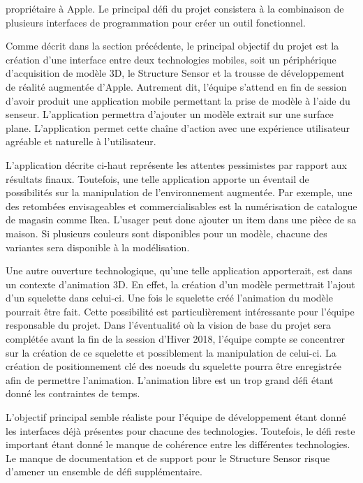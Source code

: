 \documentclass[letterpaper,twoside,12pt,french]{report}
\begin{document}
propriétaire à Apple. Le principal défi du projet consistera à la combinaison de plusieurs
interfaces de programmation pour créer un outil fonctionnel.
\par
Comme décrit dans la section précédente, le principal objectif du projet est la création d'une
interface entre deux technologies mobiles, soit un périphérique d'acquisition de modèle 3D, le
Structure Sensor et la trousse de développement de réalité augmentée d'Apple. Autrement dit,
l'équipe s'attend en fin de session d'avoir produit une application mobile permettant la prise
de modèle à l'aide du senseur. L'application permettra d'ajouter un modèle extrait sur une surface
plane. L'application permet cette chaîne d'action avec une expérience utilisateur agréable et
naturelle à l'utilisateur.
\par
L'application décrite ci-haut représente les attentes pessimistes par rapport aux résultats finaux.
Toutefois, une telle application apporte un éventail de possibilités sur la manipulation de
l'environnement augmentée. Par exemple, une des retombées envisageables et
commercialisables est la numérisation de catalogue de magasin comme Ikea. L'usager peut
donc ajouter un item dans une pièce de sa maison. Si plusieurs couleurs sont disponibles pour
un modèle, chacune des variantes sera disponible à la modélisation.
\par
Une autre ouverture technologique, qu'une telle application apporterait, est dans un contexte
d'animation 3D. En effet, la création d'un modèle permettrait l'ajout d'un squelette dans celui-ci.
Une fois le squelette créé l'animation du modèle pourrait être fait. Cette possibilité est
particulièrement intéressante pour l'équipe responsable du projet. Dans l'éventualité où la vision
de base du projet sera complétée avant la fin de la session d'Hiver 2018, l'équipe compte se
concentrer sur la création de ce squelette et possiblement la manipulation de celui-ci. La création
de positionnement clé des noeuds du squelette pourra être enregistrée afin de permettre l'animation.
L'animation libre est un trop grand défi étant donné les contraintes de temps.
\par
L'objectif principal semble réaliste pour l'équipe de développement étant donné les interfaces déjà
présentes pour chacune des technologies. Toutefois, le défi reste important étant donné le manque de
cohérence entre les différentes technologies. Le manque de documentation et de support pour le
Structure Sensor risque d'amener un ensemble de défi supplémentaire.
\par
\end{document}
